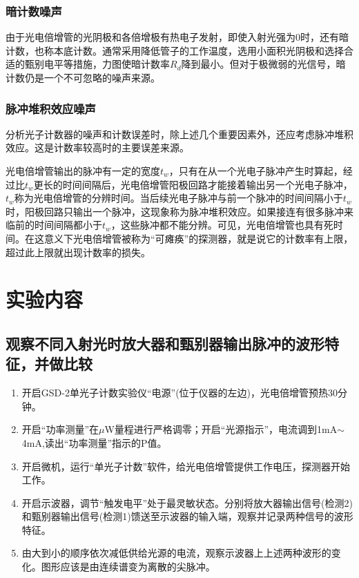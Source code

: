 \documentclass[a4paper]{article}
\begin{document}
\subsubsection{暗计数噪声}
由于光电倍增管的光阴极和各倍增极有热电子发射，即使入射光强为0时，还有暗计数，也称本底计数。通常采用降低管子的工作温度，选用小面积光阴极和选择合适的甄别电平等措施，力图使暗计数率$R_d$降到最小。但对于极微弱的光信号，暗计数仍是一个不可忽略的噪声来源。
\subsubsection{脉冲堆积效应噪声}
分析光子计数器的噪声和计数误差时，除上述几个重要因素外，还应考虑脉冲堆积效应。这是计数率较高时的主要误差来源。

光电倍增管输出的脉冲有一定的宽度$t_w$，只有在从一个光电子脉冲产生时算起，经过比$t_w$更长的时间间隔后，光电倍增管阳极回路才能接着输出另一个光电子脉冲，$t_w$称为光电倍增管的分辨时间。当后续光电子脉冲与前一个脉冲的时间间隔小于$t_w$时，阳极回路只输出一个脉冲，这现象称为脉冲堆积效应。如果接连有很多脉冲来临前的时间间隔都小于$t_w$，这些脉冲都不能分辨。可见，光电倍增管也具有死时间。在这意义下光电倍增管被称为“可瘫痪”的探测器，就是说它的计数率有上限，超过此上限就出现计数率的损失。

\section{实验内容}
\subsection{观察不同入射光时放大器和甄别器输出脉冲的波形特征，并做比较}
\begin{enumerate}
\item 开启GSD-2单光子计数实验仪“电源”(位于仪器的左边)，光电倍增管预热30分钟。
\item 开启“功率测量”在$\mu$W量程进行严格调零；开启“光源指示”，电流调到1mA$\sim$4mA,读出“功率测量”指示的P值。
\item 开启微机，运行“单光子计数”软件，给光电倍增管提供工作电压，探测器开始工作。
\item 开启示波器，调节“触发电平”处于最灵敏状态。分别将放大器输出信号(检测2)和甄别器输出信号(检测1)馈送至示波器的输入端，观察并记录两种信号的波形特征。
\item 由大到小的顺序依次减低供给光源的电流，观察示波器上上述两种波形的变化。图形应该是由连续谱变为离散的尖脉冲。
\end{enumerate} 
\end{document}
